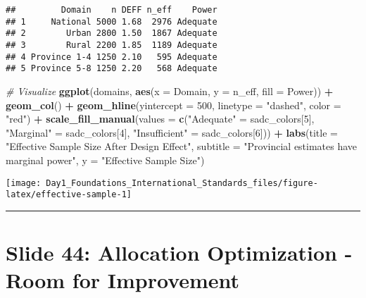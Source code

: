 \documentclass[
]{article}
\newenvironment{Shaded}{\begin{snugshade}}{\end{snugshade}}
\newcommand{\AttributeTok}[1]{\textcolor[rgb]{0.13,0.29,0.53}{#1}}
\newcommand{\CommentTok}[1]{\textcolor[rgb]{0.56,0.35,0.01}{\textit{#1}}}
\newcommand{\DecValTok}[1]{\textcolor[rgb]{0.00,0.00,0.81}{#1}}
\newcommand{\FunctionTok}[1]{\textcolor[rgb]{0.13,0.29,0.53}{\textbf{#1}}}
\newcommand{\NormalTok}[1]{#1}
\newcommand{\OtherTok}[1]{\textcolor[rgb]{0.56,0.35,0.01}{#1}}
\newcommand{\SpecialCharTok}[1]{\textcolor[rgb]{0.81,0.36,0.00}{\textbf{#1}}}
\newcommand{\StringTok}[1]{\textcolor[rgb]{0.31,0.60,0.02}{#1}}
\begin{document}
\begin{verbatim}
##         Domain    n DEFF n_eff    Power
## 1     National 5000 1.68  2976 Adequate
## 2        Urban 2800 1.50  1867 Adequate
## 3        Rural 2200 1.85  1189 Adequate
## 4 Province 1-4 1250 2.10   595 Adequate
## 5 Province 5-8 1250 2.20   568 Adequate
\end{verbatim}

\begin{Shaded}
\begin{Highlighting}[]
\CommentTok{\# Visualize}
\FunctionTok{ggplot}\NormalTok{(domains, }\FunctionTok{aes}\NormalTok{(}\AttributeTok{x =}\NormalTok{ Domain, }\AttributeTok{y =}\NormalTok{ n\_eff, }\AttributeTok{fill =}\NormalTok{ Power)) }\SpecialCharTok{+}
  \FunctionTok{geom\_col}\NormalTok{() }\SpecialCharTok{+}
  \FunctionTok{geom\_hline}\NormalTok{(}\AttributeTok{yintercept =} \DecValTok{500}\NormalTok{, }\AttributeTok{linetype =} \StringTok{"dashed"}\NormalTok{, }\AttributeTok{color =} \StringTok{"red"}\NormalTok{) }\SpecialCharTok{+}
  \FunctionTok{scale\_fill\_manual}\NormalTok{(}\AttributeTok{values =} \FunctionTok{c}\NormalTok{(}\StringTok{"Adequate"} \OtherTok{=}\NormalTok{ sadc\_colors[}\DecValTok{5}\NormalTok{],}
                               \StringTok{"Marginal"} \OtherTok{=}\NormalTok{ sadc\_colors[}\DecValTok{4}\NormalTok{],}
                               \StringTok{"Insufficient"} \OtherTok{=}\NormalTok{ sadc\_colors[}\DecValTok{6}\NormalTok{])) }\SpecialCharTok{+}
  \FunctionTok{labs}\NormalTok{(}\AttributeTok{title =} \StringTok{"Effective Sample Size After Design Effect"}\NormalTok{,}
       \AttributeTok{subtitle =} \StringTok{"Provincial estimates have marginal power"}\NormalTok{,}
       \AttributeTok{y =} \StringTok{"Effective Sample Size"}\NormalTok{)}
\end{Highlighting}
\end{Shaded}

\texttt{[image: Day1\_Foundations\_International\_Standards\_files/figure-latex/effective-sample-1]}

\begin{center}\rule{0.5\linewidth}{0.5pt}\end{center}

\section{Slide 44: Allocation Optimization - Room for
Improvement}\label{slide-44-allocation-optimization---room-for-improvement}
\end{document}
